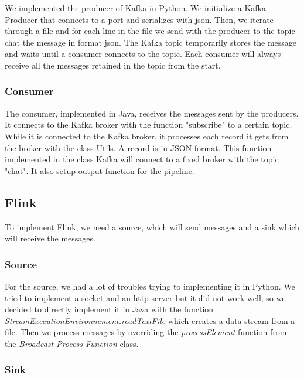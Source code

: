\documentclass[utf8,9pt]{extarticle}
\begin{document}
\hspace{2 mm} We implemented the producer of Kafka in Python. We initialize a Kafka Producer that connects to a port and serializes with json.
Then, we iterate through a file and for each line in the file we send with the producer to the topic chat the message in format json. The Kafka topic temporarily stores the message and waits until a consumer connects to the topic. Each consumer will always receive all the  messages retained in the topic from the start.

\subsubsection{Consumer}
\hspace{2 mm} The consumer, implemented in Java, receives the messages sent by the producers. It connects to the Kafka broker with the function "subscribe" to a certain topic. While it is connected to the Kafka broker, it processes each record it gets from the broker with the class Utils. A record is in JSON format. This function implemented in the class Kafka will connect to a fixed broker with the topic "chat". It also setup output function for the pipeline.
\subsection{Flink}

\hspace{2 mm} To implement Flink, we need a source, which will send messages and a sink which will receive the messages. 

\subsubsection{Source}

\hspace{2 mm} For the source, we had a lot of troubles trying to implementing it in Python. We tried to implement a socket and an http server but it did not work well, so we decided to directly implement it in Java with  the function \textit{StreamExecutionEnvironnement.readTextFile} which creates a data stream from a file. Then we process messages by overriding the \textit{processElement} function from the \textit{Broadcast Process Function} class.

\subsubsection{Sink}
\end{document}
